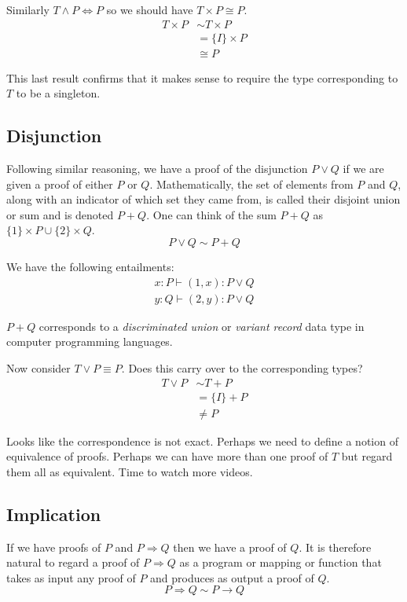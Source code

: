 \documentclass[11pt, oneside]{article}   	%
\begin{document}
Similarly $T \land P \Leftrightarrow P$ so we should have $T \times P \cong P$.
\begin{align*}
T \times P &\sim T \times P \\
		&= \{ I \} \times P \\
		&\cong P
\end{align*}

This last result confirms that it makes sense to require the type corresponding to $T$ to be a singleton.

\subsection{Disjunction}

Following similar reasoning, we have a proof of the disjunction $P \lor Q$ if we are given
a proof of either $P$ or $Q$.
Mathematically, the set of elements from $P$ and $Q$, along with an indicator of which set they came from,
is called their disjoint union or sum and is denoted $P + Q$.
One can think of the sum $P+Q$ as $\{1\} \times P \cup \{2\} \times Q$.
$$
P \lor Q \sim P + Q
$$

We have the following entailments:
\begin{eqnarray*}
x : P \vdash (1, x) : P \lor Q \\
y : Q \vdash (2, y) : P \lor Q
\end{eqnarray*}

$P + Q$ corresponds to a {\it discriminated union} or {\it variant record} data type in computer programming languages.

Now consider $T \lor P \equiv P$. Does this carry over to the corresponding types?
\begin{align*}
T \lor P	&\sim T + P \\
		&= \{ I \} + P \\
		&\neq P
\end{align*}

Looks like the correspondence is not exact.
Perhaps we need to define a notion of equivalence of proofs.
Perhaps we can have more than one proof of $T$ but regard them all as equivalent.
Time to watch more videos.

\subsection{Implication}

If we have proofs of $P$ and $P \Rightarrow Q$ then we have a proof of $Q$.
It is therefore natural to regard a proof of $P \Rightarrow Q$ as a program or mapping or function that takes as
input any proof of $P$ and produces as output a proof of $Q$.
$$
P \Rightarrow Q \sim P \rightarrow Q
$$
\end{document}
